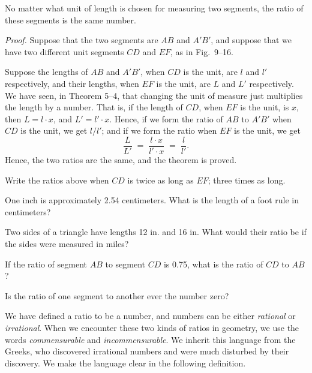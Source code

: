 \documentclass[11pt]{book}
\theoremstyle{bkplain}
\theoremstyle{XIplainnote}
\theoremstyle{bkplain}
\theoremstyle{bkplain}
\begin{document}
\begin{theorem}
No matter what unit of length is chosen for measuring two segments, the ratio of
these segments is the same number.
\end{theorem}

\noindent\emph{Proof.} Suppose that the two segments are $AB$ and $A'B'$, and
suppose that we have two different unit segments $CD$ and $EF$, as in Fig.~9--16.

\FIGIXSIXTEEN

\noindent Suppose the lengths of $AB$ and $A'B'$, when $CD$ is the unit, are $l$
and $l'$ respectively, and their lengths, when $EF$ is the unit, are $L$ and $L'$
respectively. We have seen, in Theorem 5--4, that changing the unit of measure
just multiplies the length by a number. That is, if the length of $CD$, when $EF$
is the unit, is $x$, then $L = l \cdot x$, and $L' = l' \cdot x$. Hence, if we
form the ratio of $AB$ to $A'B'$ when $CD$ is the unit, we get $l/l'$; and if we
form the ratio when $EF$ is the unit, we get
\[
  \frac{L}{L'} \;=\; \frac{l \cdot x}{l' \cdot x} \;=\; \frac{l}{l'}.
\]
Hence, the two ratios are the same, and the theorem is proved.

\begin{exercisecols}
\begin{exlist}
\item Write the ratios above when $CD$ is twice as long as $EF$; three times as
      long.
\item One inch is approximately 2.54 centimeters. What is the length of a foot
      rule in centimeters?
\item Two sides of a triangle have lengths 12 in. and 16 in. What would their
      ratio be if the sides were measured in miles?
\item If the ratio of segment $AB$ to segment $CD$ is 0.75, what is the ratio of
      $CD$ to $AB$?
\item Is the ratio of one segment to another ever the number zero?
\end{exlist}
\end{exercisecols}

We have defined a ratio to be a number, and numbers can be either \emph{rational}
or \emph{irrational}. When we encounter these two kinds of ratios in geometry, we
use the words \emph{commensurable} and \emph{incommensurable}. We inherit this
language from the Greeks, who discovered irrational numbers and were much
disturbed by their discovery. We make the language clear in the following
definition.
\end{document}

